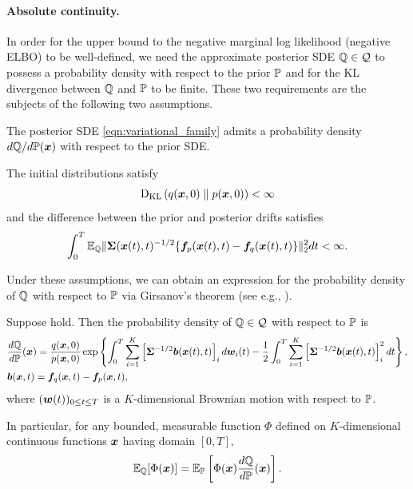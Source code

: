 \paragraph{Absolute continuity.}
In order for the upper bound to the negative marginal log likelihood (negative ELBO) to be well-defined, we need the approximate posterior SDE $\mathbb{Q} \in \mathcal{Q}$ to possess a probability density with respect to the prior $\mathbb{P}$ and for the KL divergence between $\mathbb{Q}$ and $\mathbb{P}$ to be finite. 
These two requirements are the subjects of the following two assumptions.
 
\begin{assumption}\label{app:ass:path-ac}
The posterior SDE \cref{eqn:variational_family} admits a probability density $d\mathbb{Q}/d\mathbb{P}(\boldsymbol{x})$ with respect to the prior SDE.
\end{assumption}

\begin{assumption}\label{app:ass:finite-kl}
   The initial distributions satisfy
   \begin{equation*}
       \textrm{D}_{\textrm{KL}}\left(q(\boldsymbol{x},0)\;\|\;p(\boldsymbol{x},0)\right)<\infty
   \end{equation*}
    and the difference between the prior and posterior drifts satisfies
    \begin{equation*}
        \int_0^{T} \mathbb{E}_{\mathbb{Q}}\| \boldsymbol{\Sigma}(\boldsymbol{x}(t), t)^{-1/2}\{\boldsymbol{f}_p(\boldsymbol{x}(t),t) -  \boldsymbol{f}_q(\boldsymbol{x}(t), t)\}\|_2^2 dt < \infty.
    \end{equation*}
\end{assumption}
 

Under these assumptions, we can obtain an expression for the probability density of $\mathbb{Q}$ with respect to $\mathbb{P}$ via Girsanov's theorem (see e.g., \citet[Corollary 3.5.13]{karatzas2014brownian}).
\begin{theorem}\label{app:thm:girsanov}
Suppose  hold. Then the probability density of $\mathbb{Q} \in \mathcal{Q}$ with respect to $\mathbb{P}$ is
{\small
\begin{equation*}
\begin{aligned}
&\frac{d \mathbb{Q}}{d \mathbb{P}}(\boldsymbol{x}) = \frac{ q(\boldsymbol{x}, 0)}{p(\boldsymbol{x}, 0)}\exp\left\{ \int_0^{T} \sum_{i=1}^{K} \left[\boldsymbol{\Sigma}^{-1/2} \boldsymbol{b}(\boldsymbol{x}(t), t)\right]_i d\boldsymbol{w}_i(t) - \frac{1}{2} \int_0^{T} \sum_{i=1}^{K} \left[\boldsymbol{\Sigma}^{-1/2} \boldsymbol{b}(\boldsymbol{x}(t), t)\right]_i^2 dt \right\},\\
&\boldsymbol{b}(\boldsymbol{x}, t) = \boldsymbol{f}_q(\boldsymbol{x}, t) - \boldsymbol{f}_p(\boldsymbol{x}, t),
\end{aligned}
\end{equation*}
}
where $(\boldsymbol{w}(t))_{0 \leq t \leq T}$ is a $K$-dimensional Brownian motion with respect to $\mathbb{P}$. 

\smallskip
In particular, for any bounded, measurable function $\Phi$ defined on $K$-dimensional continuous functions $\boldsymbol{x}$ having domain $[0, T]$,
\begin{equation*}
    \mathbb{E}_{\mathbb{Q}}[\Phi(\boldsymbol{x})] = \mathbb{E}_{\mathbb{P}}\left[\Phi(\boldsymbol{x}) \frac{d \mathbb{Q}}{d \mathbb{P}}(\boldsymbol{x}) \right].
\end{equation*}
\end{theorem}

